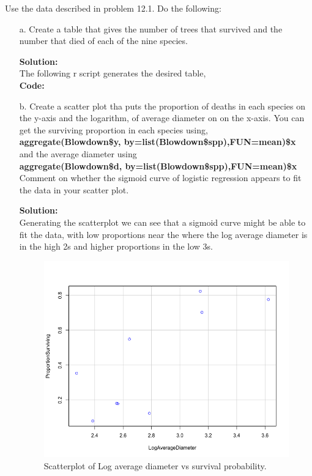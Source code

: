 \documentclass[12pt]{article}
\makeatletter
\theoremstyle{homework}
\newenvironment{exercise}[1]
{\def\@currentlabel{#1}\exercisecore}
{\endexercisecore}
\newcommand{\localhead}[1]{\par\smallskip\noindent\textbf{#1}\nobreak\\}%
\newcommand\solution{\localhead{Solution:}}
\makeatother
\begin{document}
\begin{exercise}{1} Use the data described in problem 12.1. Do the following:
  \begin{enumerate}
    \item[a.] Create  a table that gives the number of trees that survived and the number that died of each of the nine species.\\
    \solution  The following r script generates the desired table, \\
    \textbf{Code:}
    \begin{center}
    
    \end{center} 
    \newpage

    \item[b.] Create a scatter plot tha puts the proportion of deaths in each species on the y-axis and the logarithm, of average diameter on 
    on the x-axis. You can get the surviving proportion in each species using, \\
    \textbf{aggregate(Blowdown\$y, by=list(Blowdown\$spp),FUN=mean)\$x}\\
    and the average diameter using\\
    \textbf{aggregate(Blowdown\$d, by=list(Blowdown\$spp),FUN=mean)\$x}\\
    Comment on whether the sigmoid curve of logistic regression appears to fit the data in your scatter plot. \\
    \solution Generating the scatterplot we can see that a sigmoid curve might be able to fit the data, with low proportions near the where the 
    log average diameter is in the high 2s and higher proportions in the low 3s. \\
    \begin{figure}[H]
      \begin{center}
      \caption{Scatterplot of Log average diameter vs survival probability.}
      \includegraphics[width = \textwidth]{Rplot01.png}
      \end{center}
    \end{figure}
    \newpage



\end{enumerate}
\end{exercise}
\end{document}
